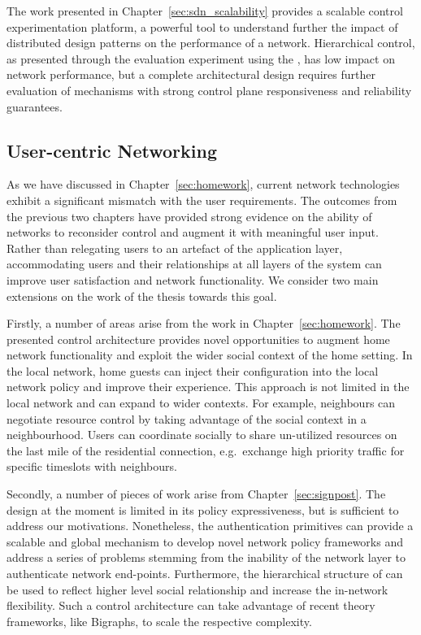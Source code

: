 The work presented in Chapter~\ref{sec:sdn_scalability} provides a scalable
control experimentation platform, a powerful tool to understand further the
impact of  distributed design patterns on the performance of a network.
Hierarchical control, as presented through the evaluation experiment using the
\sdnsim, has low impact on network performance, but a complete architectural
design requires further evaluation of mechanisms with strong control plane
responsiveness and reliability guarantees. 

\subsection{User-centric Networking}

As we have discussed in Chapter~\ref{sec:homework}, current network technologies
exhibit a significant mismatch with the user requirements. The outcomes from the
previous two chapters have provided strong evidence on the ability of networks to
reconsider control and augment it with meaningful user input. Rather than
relegating users to an artefact of the application layer, accommodating users
and their relationships at all layers of the system can improve user
satisfaction and network functionality. We consider two main extensions on the
work of the thesis towards this goal. 

Firstly, a number of areas arise from the work in Chapter~\ref{sec:homework}.
The presented control architecture provides novel opportunities to augment home
network functionality and exploit the wider social context of the home setting.
In the local network, home guests can inject their configuration into the local
network policy and improve their experience. This approach is not limited in
the local network and can expand to wider contexts. For example, neighbours can
negotiate  resource control by taking advantage of the social context in a
neighbourhood. Users can coordinate socially to share un-utilized resources on
the last mile of the residential connection,  e.g.~exchange high priority
traffic for specific timeslots with neighbours.

Secondly, a number of pieces of work arise from Chapter~\ref{sec:signpost}.
The \signpost design at the moment is limited in its policy expressiveness, but
is sufficient to address our motivations.  Nonetheless, the authentication
primitives can provide a scalable and global mechanism to develop novel network
policy frameworks and address a series of problems stemming from the inability
of the network layer to authenticate network end-points. Furthermore, the
hierarchical structure of \signpost can be used to reflect higher level social
relationship and increase the in-network flexibility. Such a control
architecture can take advantage of recent theory frameworks, like Bigraphs, to
scale the respective complexity. 

